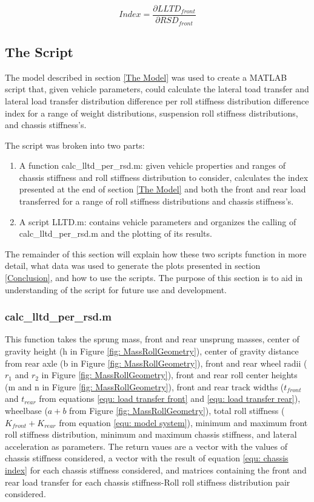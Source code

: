 \documentclass[a4paper]{article}
\numberwithin{equation}{section}
\begin{document}
\begin{equation}
Index=\frac{\partial LLTD_{front}}{\partial RSD_{front}}
\label{equ: chassis index}
\end{equation}

\subsection{The Script} \label{The Script}
The model described in section \ref{The Model} was used to create a MATLAB script that, given vehicle parameters, could calculate the lateral toad transfer and lateral load transfer distribution difference per roll stiffness distribution difference index for a range of weight distributions, suspension roll stiffness distributions, and chassis stiffness’s.

The script was broken into two parts:
\begin{enumerate}
	\item A function calc\_lltd\_per\_rsd.m: given vehicle properties and ranges of chassis stiffness and roll stiffness distribution to consider, calculates the index presented at the end of section \ref{The Model} and both the front and rear load transferred for a range of roll stiffness distributions and chassis stiffness’s.
	\item A script LLTD.m: contains vehicle parameters and organizes the calling of calc\_lltd\_per\_rsd.m and the plotting of its results.
\end{enumerate}

The remainder of this section will explain how these two scripts function in more detail, what data was used to generate the plots presented in section \ref{Conclusion}, and how to use the scripts. The purpose of this section is to aid in understanding of the script for future use and development.

\subsubsection{calc\_lltd\_per\_rsd.m} \label{calc_lltd_per_rsd.m}
This function takes the sprung mass, front and rear unsprung masses, center of gravity height (h in Figure \ref{fig: MassRollGeometry}), center of gravity distance from rear axle (b in Figure \ref{fig: MassRollGeometry}), front and rear wheel radii ($r_1$ and $r_2$ in Figure \ref{fig: MassRollGeometry}), front and rear roll center heights (m and n in Figure \ref{fig: MassRollGeometry}), front and rear track widths ($t_{front}$ and $t_{rear}$ from equations \ref{equ: load transfer front} and \ref{equ: load transfer rear}), wheelbase ($a+b$ from Figure \ref{fig: MassRollGeometry}), total roll stiffness ($K_{front} + K_{rear}$ from equation \ref{equ: model system}), minimum and maximum front roll stiffness distribution, minimum and maximum chassis stiffness, and lateral acceleration as parameters. The return vaues are a vector with the values of chassis stiffness considered, a vector with the result of equation \ref{equ: chassis index} for each chassis stiffness considered, and matrices containing the front and rear load transfer for each chassis stiffness-Roll roll stiffness distribution pair considered.
\end{document}
